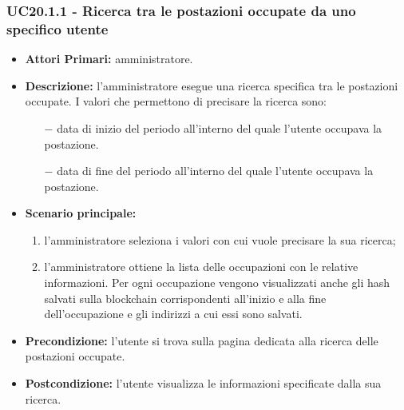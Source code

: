 \subsubsection{ UC20.1.1 - Ricerca tra le postazioni occupate da uno specifico utente}
\begin{itemize}
	\item\textbf{Attori Primari:} 
	amministratore.
	\item\textbf{Descrizione:} 
	l'amministratore esegue una ricerca specifica tra le postazioni occupate.
	I valori che permettono di precisare la ricerca sono:
	\begin{itemize}
		\item[$-$] data di inizio del periodo all'interno del quale l'utente occupava la postazione.
		\item[$-$] data di fine del periodo all'interno del quale l'utente occupava la postazione.
	\end{itemize}
	\item\textbf{Scenario principale:} 
	\begin{enumerate}
		\item l'amministratore seleziona i valori con cui vuole precisare la sua ricerca;
		\item l'amministratore ottiene la lista delle occupazioni con le relative informazioni. Per ogni occupazione vengono visualizzati anche gli hash salvati sulla blockchain corrispondenti all'inizio e alla fine dell'occupazione e gli indirizzi a cui essi sono salvati.
	\end{enumerate}
	\item\textbf{Precondizione:} 
	l'utente si trova sulla pagina dedicata alla ricerca delle postazioni occupate.
	\item\textbf{Postcondizione:}
	l'utente visualizza le informazioni specificate dalla sua ricerca.
\end{itemize}

